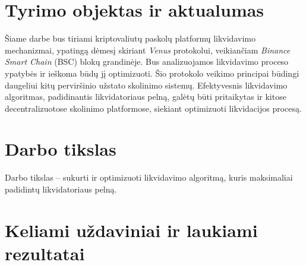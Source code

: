 \documentclass[]{VUMIFTemplateClass}
\begin{document}

\onehalfspacing




\section{Tyrimo objektas ir aktualumas}

Šiame darbe bus tiriami kriptovaliutų paskolų platformų likvidavimo mechanizmai, ypatingą dėmesį skiriant \textit{Venus} protokolui, veikiančiam \textit{Binance Smart Chain} (BSC) blokų grandinėje. Bus analizuojamos likvidavimo proceso ypatybės ir ieškoma būdų jį optimizuoti. Šio protokolo veikimo principai būdingi daugeliui kitų perviršinio užstato skolinimo sistemų. Efektyvesnis likvidavimo algoritmas, padidinantis likvidatoriaus pelną, galėtų būti pritaikytas ir kitose decentralizuotose skolinimo platformose, siekiant optimizuoti likvidacijos procesą.

\section{Darbo tikslas}

Darbo tikslas – sukurti ir optimizuoti likvidavimo algoritmą, kuris maksimaliai padidintų likvidatoriaus pelną.

\section{Keliami uždaviniai ir laukiami rezultatai}
\end{document}
